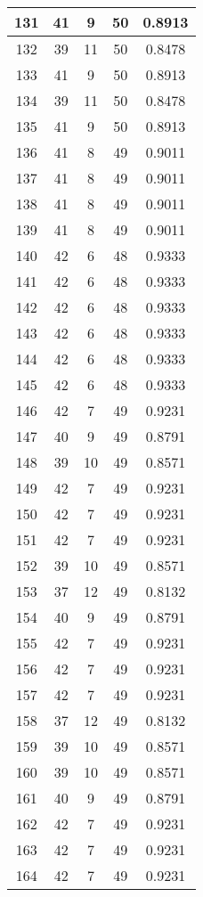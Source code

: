 \documentclass[letterpaper, 12pt]{article}
\begin{document}
\begin{longtable}{|c|c|c|c|c|}
\hline
131 & 41 & 9 & 50 & 0.8913 \\
\hline
132 & 39 & 11 & 50 & 0.8478 \\
\hline
133 & 41 & 9 & 50 & 0.8913 \\
\hline
134 & 39 & 11 & 50 & 0.8478 \\
\hline
135 & 41 & 9 & 50 & 0.8913 \\
\hline
136 & 41 & 8 & 49 & 0.9011 \\
\hline
137 & 41 & 8 & 49 & 0.9011 \\
\hline
138 & 41 & 8 & 49 & 0.9011 \\
\hline
139 & 41 & 8 & 49 & 0.9011 \\
\hline
140 & 42 & 6 & 48 & 0.9333 \\
\hline
141 & 42 & 6 & 48 & 0.9333 \\
\hline
142 & 42 & 6 & 48 & 0.9333 \\
\hline
143 & 42 & 6 & 48 & 0.9333 \\
\hline
144 & 42 & 6 & 48 & 0.9333 \\
\hline
145 & 42 & 6 & 48 & 0.9333 \\
\hline
146 & 42 & 7 & 49 & 0.9231 \\
\hline
147 & 40 & 9 & 49 & 0.8791 \\
\hline
148 & 39 & 10 & 49 & 0.8571 \\
\hline
149 & 42 & 7 & 49 & 0.9231 \\
\hline
150 & 42 & 7 & 49 & 0.9231 \\
\hline
151 & 42 & 7 & 49 & 0.9231 \\
\hline
152 & 39 & 10 & 49 & 0.8571 \\
\hline
153 & 37 & 12 & 49 & 0.8132 \\
\hline
154 & 40 & 9 & 49 & 0.8791 \\
\hline
155 & 42 & 7 & 49 & 0.9231 \\
\hline
156 & 42 & 7 & 49 & 0.9231 \\
\hline
157 & 42 & 7 & 49 & 0.9231 \\
\hline
158 & 37 & 12 & 49 & 0.8132 \\
\hline
159 & 39 & 10 & 49 & 0.8571 \\
\hline
160 & 39 & 10 & 49 & 0.8571 \\
\hline
161 & 40 & 9 & 49 & 0.8791 \\
\hline
162 & 42 & 7 & 49 & 0.9231 \\
\hline
163 & 42 & 7 & 49 & 0.9231 \\
\hline
164 & 42 & 7 & 49 & 0.9231 \\

\end{longtable}
\end{document}
